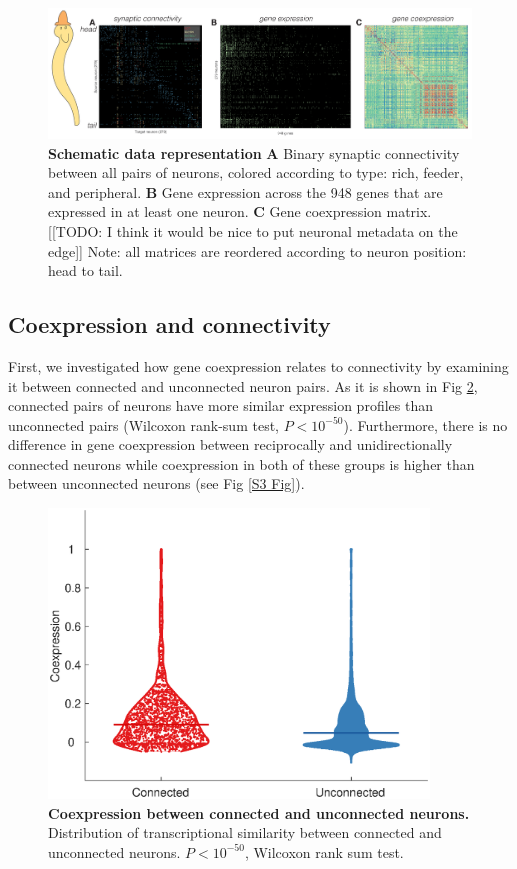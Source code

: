 \documentclass[10pt,letterpaper]{article}
\begin{document}
\begin{figure}[t]
  \centering
    \includegraphics[width=1\textwidth]{schematic.pdf}
 \caption{\textbf{Schematic data representation}
 \textbf{A} Binary synaptic connectivity between all pairs of neurons, colored according to type: rich, feeder, and peripheral.
  \textbf{B} Gene expression across the 948 genes that are expressed in at least one neuron.
 \textbf{C} Gene coexpression matrix. 
[[TODO: I think it would be nice to put neuronal metadata on the edge]]
Note: all matrices are reordered according to neuron position: head to tail.}
\label{fig:SchematicRepresentation}
\end{figure}

\subsection*{Coexpression and connectivity}

First, we investigated how gene coexpression relates to connectivity by examining it between connected and unconnected neuron pairs.
As it is shown in Fig \ref{fig:ConUncon}, connected pairs of neurons have more similar expression profiles than unconnected pairs (Wilcoxon rank-sum test, $P < 10^{-50}$). Furthermore, there is no difference in gene coexpression between reciprocally and unidirectionally connected neurons while coexpression in both of these groups is higher than between unconnected neurons (see Fig \ref{S3 Fig}).

\begin{figure}[!h]
   \centering
    \includegraphics[width=0.9\textwidth]{ConUncon.eps}
 \caption{{\bf Coexpression between connected and unconnected neurons.}
Distribution of transcriptional similarity between connected and unconnected neurons.
$P<10^{-50}$, Wilcoxon rank sum test.}
 \label{fig:ConUncon}
\end{figure}
\end{document}
